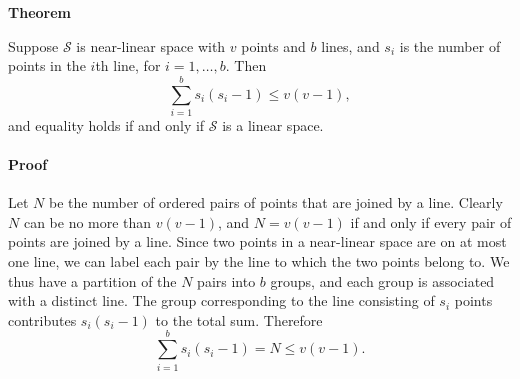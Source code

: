 \documentclass[12pt]{article}
\begin{document}

{\bf Theorem}

Suppose $\mathscr{S}$ is near-linear space with $v$ points and $b$ lines, and $s_i$ is the number of points in the $i$th line, for $i=1,\ldots, b$. Then
\[
\sum_{i=1}^b s_i(s_i-1) \leq v(v-1),
\] 
and equality holds if and only if $\mathscr{S}$ is a linear space.

\paragraph{Proof}

Let $N$ be the number of ordered pairs of points that are joined by a line. Clearly $N$ can be no more than $v(v-1)$, and $N=v(v-1)$ if and only if every pair of points are joined by a line. Since two points in a near-linear space are on at most one line, we can label each pair by the line to which the two points belong to. We thus have a partition of the $N$ pairs into $b$ groups, and each group is associated with a distinct line. The group corresponding to the line consisting of $s_i$ points contributes $s_i(s_i-1)$ to the total sum. Therefore
\[
 \sum_{i=1}^b s_i(s_i-1) = N \leq v(v-1).
\]
\end{document}
